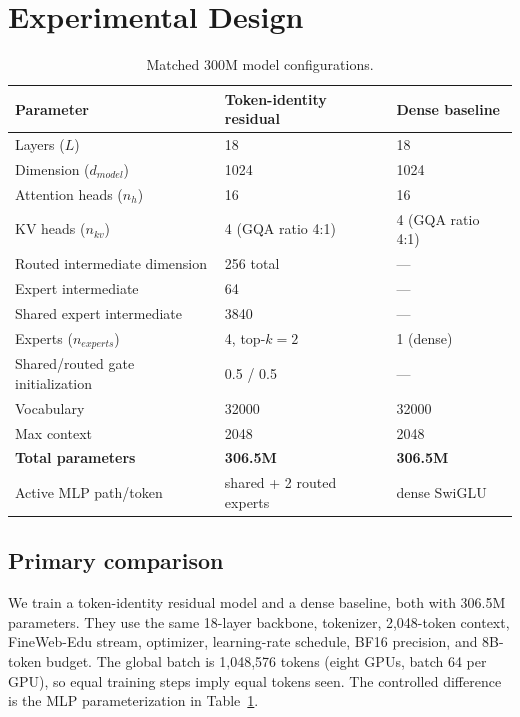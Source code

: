 \documentclass[10pt]{article}
\theoremstyle{definition}
\theoremstyle{remark}
\begin{document}
\section{Experimental Design}
\label{sec:experiments}

\begin{table}[h]
\centering
\caption{Matched 300M model configurations.}
\label{tab:config_300m}
\begin{tabular}{lll}
\toprule
\textbf{Parameter} & \textbf{Token-identity residual} & \textbf{Dense baseline} \\
\midrule
Layers ($L$) & 18 & 18 \\
Dimension ($d_{model}$) & 1024 & 1024 \\
Attention heads ($n_h$) & 16 & 16 \\
KV heads ($n_{kv}$) & 4 (GQA ratio 4:1) & 4 (GQA ratio 4:1) \\
Routed intermediate dimension & 256 total & --- \\
Expert intermediate & 64 & --- \\
Shared expert intermediate & 3840 & --- \\
Experts ($n_{experts}$) & 4, top-$k=2$ & 1 (dense) \\
Shared/routed gate initialization & 0.5 / 0.5 & --- \\
Vocabulary & 32000 & 32000 \\
Max context & 2048 & 2048 \\
\midrule
\textbf{Total parameters} & \textbf{306.5M} & \textbf{306.5M} \\
Active MLP path/token & shared + 2 routed experts & dense SwiGLU \\
\bottomrule
\end{tabular}
\end{table}

\subsection{Primary comparison}
\label{sec:config_300m}

We train a token-identity residual model and a dense baseline, both with 306.5M parameters. They use the same 18-layer backbone, tokenizer, 2,048-token context, FineWeb-Edu stream, optimizer, learning-rate schedule, BF16 precision, and 8B-token budget. The global batch is 1,048,576 tokens (eight GPUs, batch 64 per GPU), so equal training steps imply equal tokens seen. The controlled difference is the MLP parameterization in Table~\ref{tab:config_300m}.
\end{document}
